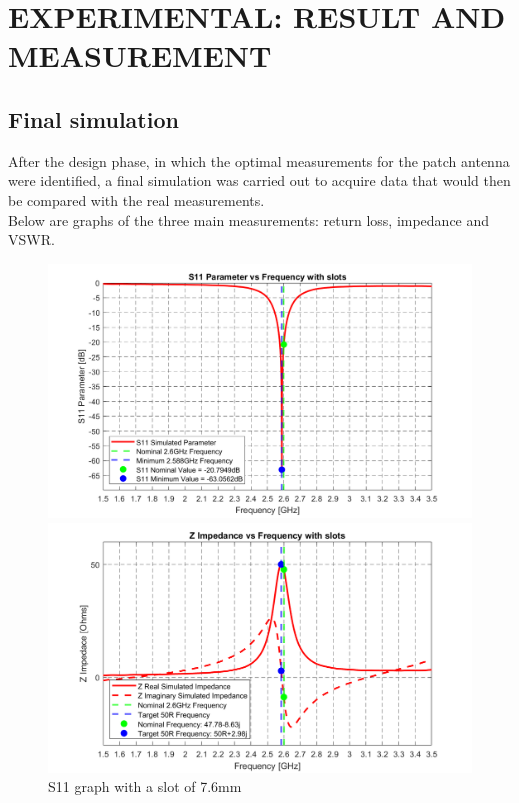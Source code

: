 \documentclass[]{article}
\begin{document}
\newpage
\section{EXPERIMENTAL: RESULT AND MEASUREMENT}
\subsection{Final simulation}
After the design phase, in which the optimal measurements for the patch antenna were identified, a final simulation was carried out to acquire data that would then be compared with the real measurements.\\
Below are graphs of the three main measurements: return loss, impedance and VSWR.\\

\begin{figure}[h]
	\centering
	\begin{minipage}{0.48\linewidth}
		\centering
		\includegraphics[width=\linewidth]{img/S11_vs_freq_w_slots_small}
		\caption{S11 graph with a slot of 7.6mm}
		\label{S11FIN}
	\end{minipage}
	\hfill
	\begin{minipage}{0.48\linewidth}
		\centering
		\includegraphics[width=\linewidth]{img/Z_vs_Freq_w_slots_small}

\end{minipage}
\end{figure}
\end{document}
